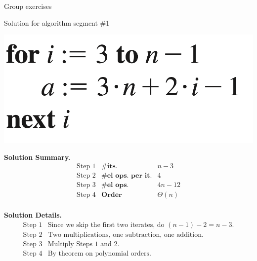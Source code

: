 \documentclass[10pt]{beamer}
\begin{document}
\begin{frame}{Group exercises}
\end{frame}




\begin{frame}{Solution for algorithm segment \#1}
\begin{center}
    \includegraphics[width=.4\linewidth]{images/epp_hw_6}%
\end{center}

\colorbox{green!30}{\textbf{Solution Summary.}}
\[ 
\begin{array}{lll}
\text{Step 1} & \textbf{\# its.} & n-3 \\
\text{Step 2} & \textbf{\# el ops. per it.} & 4 \\
\text{Step 3}& \textbf{\# el ops.} & 4n-12 \\
\text{Step 4} & \textbf{Order} & \Theta(n) \\
\end{array}
\]

\colorbox{red!30}{\textbf{Solution Details.}}
\[ 
\begin{array}{ll}
\text{Step 1} & \text{Since we skip the first two iterates, do $(n-1) - 2 = n-3$.} \\
\text{Step 2} & \text{Two multiplications, one subtraction, one addition.} \\
\text{Step 3}& \text{Multiply Steps 1 and 2.} \\
\text{Step 4} & \text{By theorem on polynomial orders.}\\
\end{array}
\]
    	
\end{frame}
\end{document}

